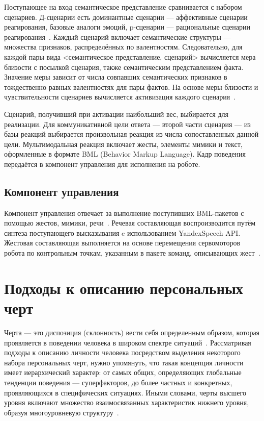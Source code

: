 Поступающее на вход семантическое представление сравнивается с набором сценариев.
Д-сценарии есть доминантные сценарии --- аффективные сценарии реагирования, базовые аналоги эмоций, p-сценарии --- рациональные сценарии реагирования~\cite{kotov_nosovets2023_derived_representation}.
Каждый сценарий включает семантические структуры --- множества признаков, распределённых по валентностям.
Следовательно, для каждой пары вида <семантическое представление, сценарий> вычисляется мера близости с посылкой сценария, также семантическим представлением факта.
Значение меры зависит от числа совпавших семантических признаков в тождественно равных валентностях для пары фактов.
На основе меры близости и чувствительности сценариев вычисляется активизация каждого сценария~\cite{zinina2018_f2_rec}.

Сценарий, получивший при активации наибольший вес, выбирается для реализации.
Для коммуникативной цели ответа --- второй части сценария --- из базы реакций выбирается произвольная реакция из числа сопоставленных данной цели.
Мультимодальная реакция включает жесты, элементы мимики и текст, оформленные в формате BML (Behavior Markup Language).
Кадр поведения передаётся в компонент управления для исполнения на роботе.

\subsection{Компонент управления}

Компонент управления отвечает за выполнение поступивших BML-пакетов с помощью жестов, мимики, речи~\cite{kotov_f2_architecture}.
Речевая составляющая воспроизводится путём синтеза поступающего высказывания c использованием YandexSpeech API.
Жестовая составляющая выполняется на основе перемещения сервомоторов робота по контрольным точкам, указанным в пакете команд, описывающих жест~\cite{Arinkin2016VKR}.

\section{Подходы к описанию персональных черт}

Черта --- это диспозиция (склонность) вести себя определенным образом, которая проявляется в поведении человека в широком спектре ситуаций~\cite{PervinJohn2001Personality}.
Рассматривая подходы к описанию личности человека посредством выделения некоторого набора персональных черт, нужно упомянуть, что такая концепция личности имеет иерархический характер: от самых общих, определяющих глобальные тенденции поведения --- суперфакторов, до более частных и конкретных, проявляющихся в специфических ситуациях.
Иными словами, черты высшего уровня включают множество взаимосвязанных характеристик нижнего уровня, образуя многоуровневую структуру~\cite{PervinJohn2001Personality}.

